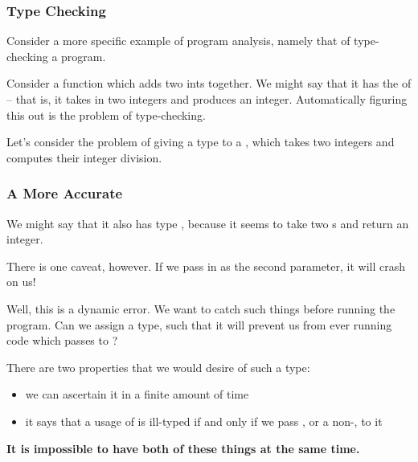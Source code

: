 \documentclass[aspectratio=169, handout]{beamer}
\begin{document}

\begin{frame}[fragile]
  \frametitle{Type Checking}

  Consider a more specific example of program analysis, namely that of
  type-checking a program.

  \pause
  \vspace{\fill}

  Consider a function  which adds two ints together. We might say that
  it has the  of  -- that is, it takes in
  two integers and produces an integer. Automatically figuring this out is the
  problem of type-checking.

  \pause
  \vspace{\fill}

  Let's consider the problem of giving a type to a , which
  takes two integers and computes their integer division.
\end{frame}

\begin{frame}[fragile]
  \frametitle{A More Accurate }

  We might say that it also has type , because it seems
  to take two s and return an integer.

  \pause
  \vspace{\fill}

  There is one caveat, however. If we pass in  as the second parameter,
  it will crash on us!

  \pause
  \vspace{\fill}

  Well, this is a dynamic error. We want to catch such things before running
  the program. Can we assign  a type, such that it will prevent us
  from ever running code which passes  to ?

  \pause
  \vspace{\fill}

  There are two properties that we would desire of such a type:
  \begin{itemize}
    \item we can ascertain it in a finite amount of time \pause
    \item it says that a usage of  is ill-typed if and only if
    we pass , or a non-, to it
  \end{itemize}

  \pause
  \vspace{\fill}

  \textbf{It is impossible to have both of these things at the same time.}
\end{frame}
\end{document}
